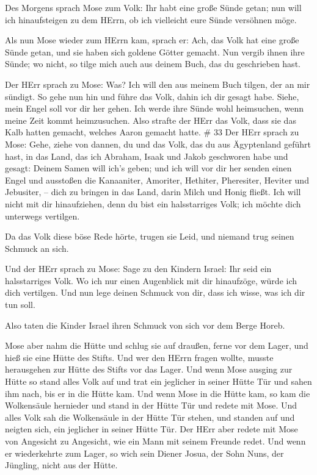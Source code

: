 Des Morgens sprach Mose zum Volk: Ihr habt eine große
Sünde getan; nun will ich hinaufsteigen zu dem HErrn, ob ich vielleicht
eure Sünde versöhnen möge.

 Als nun Mose wieder zum HErrn kam, sprach er: Ach, das
Volk hat eine große Sünde getan, und sie haben sich goldene Götter
gemacht.  Nun vergib ihnen ihre Sünde; wo nicht, so tilge
mich auch aus deinem Buch, das du geschrieben hast.

 Der HErr sprach zu Mose: Was? Ich will den aus meinem Buch
tilgen, der an mir sündigt.  So gehe nun hin und führe das
Volk, dahin ich dir gesagt habe. Siehe, mein Engel soll vor dir her
gehen. Ich werde ihre Sünde wohl heimsuchen, wenn meine Zeit kommt
heimzusuchen.  Also strafte der HErr das Volk, dass sie das
Kalb hatten gemacht, welches Aaron gemacht hatte. \# 33  Der
HErr sprach zu Mose: Gehe, ziehe von dannen, du und das Volk, das du aus
Ägyptenland geführt hast, in das Land, das ich Abraham, Isaak und Jakob
geschworen habe und gesagt: Deinem Samen will ich's geben; 
und ich will vor dir her senden einen Engel und ausstoßen die
Kanaaniter, Amoriter, Hethiter, Pheresiter, Heviter und Jebusiter, --
 dich zu bringen in das Land, darin Milch und Honig fließt.
Ich will nicht mit dir hinaufziehen, denn du bist ein halsstarriges
Volk; ich möchte dich unterwegs vertilgen.

 Da das Volk diese böse Rede hörte, trugen sie Leid, und
niemand trug seinen Schmuck an sich.

 Und der HErr sprach zu Mose: Sage zu den Kindern Israel:
Ihr seid ein halsstarriges Volk. Wo ich nur einen Augenblick mit dir
hinaufzöge, würde ich dich vertilgen. Und nun lege deinen Schmuck von
dir, dass ich wisse, was ich dir tun soll.

 Also taten die Kinder Israel ihren Schmuck von sich vor dem
Berge Horeb.

 Mose aber nahm die Hütte und schlug sie auf draußen, ferne
vor dem Lager, und hieß sie eine Hütte des Stifts. Und wer den HErrn
fragen wollte, musste herausgehen zur Hütte des Stifts vor das Lager.
 Und wenn Mose ausging zur Hütte so stand alles Volk auf und
trat ein jeglicher in seiner Hütte Tür und sahen ihm nach, bis er in die
Hütte kam.  Und wenn Mose in die Hütte kam, so kam die
Wolkensäule hernieder und stand in der Hütte Tür und redete mit Mose.
 Und alles Volk sah die Wolkensäule in der Hütte Tür
stehen, und standen auf und neigten sich, ein jeglicher in seiner Hütte
Tür.  Der HErr aber redete mit Mose von Angesicht zu
Angesicht, wie ein Mann mit seinem Freunde redet. Und wenn er
wiederkehrte zum Lager, so wich sein Diener Josua, der Sohn Nuns, der
Jüngling, nicht aus der Hütte.

